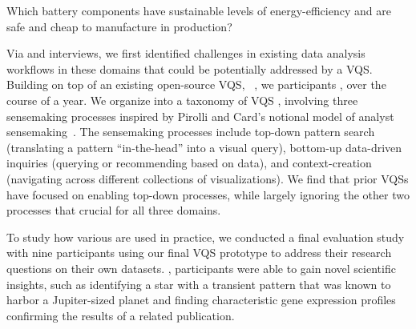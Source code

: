 Which battery components have sustainable
levels of energy-efficiency and are safe and
cheap to manufacture in production?
\par Via  and interviews, we first identified challenges in existing data analysis workflows in these domains
that could be potentially addressed by a VQS. Building on top of an existing open-source VQS, \zv~\cite{Siddiqui2017,Siddiqui2017VLDB}, we  participants , over the course of a year. We organize  into a taxonomy of VQS , involving three sensemaking processes inspired by Pirolli and Card's notional model of analyst sensemaking~\cite{Pirolli}. The sensemaking processes include top-down pattern search (translating a pattern ``in-the-head'' into a visual query), bottom-up data-driven inquiries (querying or recommending based on data), and context-creation (navigating across different collections of visualizations). We find that prior VQSs have focused on enabling top-down processes, while largely ignoring the other two processes that  crucial for all three domains.
\par To study how various  are used in practice,
we conducted a final evaluation study with nine participants
using our final VQS prototype to address their research questions
on their own datasets.
, participants were able to
gain novel scientific insights,
such as identifying a star with a transient pattern
that was known to harbor a Jupiter-sized planet
and finding characteristic gene expression profiles confirming the results of a related publication. 

